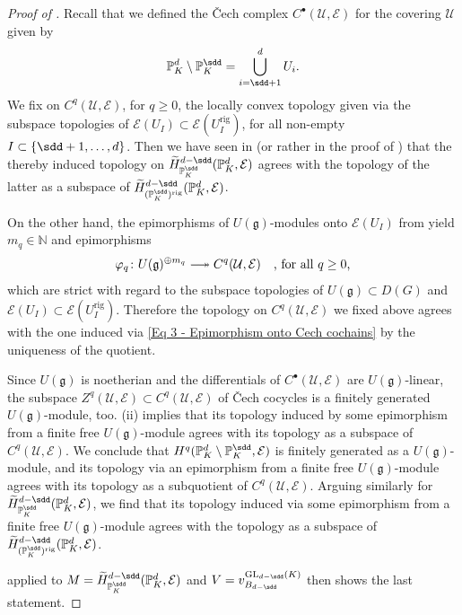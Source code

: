 \documentclass[a4paper, reqno, 10pt]{amsart}
\theoremstyle{definition}
\numberwithin{equation}{section}
\newcommand{\GL}{{\mathrm{GL}}}
\newcommand{\rig}{{\mathrm{rig}}}
\newcommand{\BN}{{\mathbb {N}}}
\newcommand{\BP}{{\mathbb {P}}}
\newcommand{\CE}{{\mathcal {E}}}
\newcommand{\CU}{{\mathcal {U}}}
\newcommand{\Fg}{{\mathfrak {g}}}
\DeclareRobustCommand\longtwoheadrightarrow
{\relbar\joinrel\twoheadrightarrow}
\begin{document}
\begin{proof}[{Proof of }]
	Recall that we defined the \v{C}ech complex $C^\bullet(\CU, \CE)$ for the covering $\CU$ given by
	\begin{equation*}
		\BP_K^d \setminus \BP_K^\sdd = \bigcup_{i= \sdd+1}^d U_i .
	\end{equation*}
	We fix on $C^q (\CU,\CE)$, for $q\geq 0$, the locally convex topology given via the subspace topologies of $\CE(U_I) \subset \CE(U_I^\rig)$, for all non-empty $I \subset \{\sdd+1,\ldots,d\}$.
	Then we have seen in  (or rather in the proof of ) that the thereby induced topology on $\widetilde{H}^{d-\sdd}_{\BP_K^\sdd} (\BP_K^d, \CE) $ agrees with the topology of the latter as a subspace of $\widetilde{H}^{d-\sdd}_{(\BP_K^{\sdd})^\rig} (\BP_K^d, \CE)$.
	
	
	On the other hand, the epimorphisms of $U(\Fg)$-modules onto $\CE(U_I)$ from  yield $m_q \in \BN$ and epimorphisms 
	\begin{equation}\label{Eq 3 - Epimorphism onto Cech cochains}
		\varphi_q \colon U(\Fg)^{\oplus m_q} \longtwoheadrightarrow C^q(\CU,\CE) \quad\text{, for all $q\geq 0$,}
	\end{equation}
	which are strict with regard to the subspace topologies of $U(\Fg) \subset D(G)$ and $\CE(U_I) \subset \CE(U_I^\rig)$.
	Therefore the topology on $C^q(\CU,\CE)$ we fixed above agrees with the one induced via \eqref{Eq 3 - Epimorphism onto Cech cochains} by the uniqueness of the quotient.
	
	
	Since $U(\Fg)$ is noetherian and the differentials of $C^\bullet(\CU,\CE)$ are $U(\Fg)$-linear, the subspace $Z^q(\CU,\CE) \subset C^q(\CU,\CE)$ of \v{C}ech cocycles is a finitely generated $U(\Fg)$-module, too.
	 (ii) implies that its topology induced by some epimorphism from a finite free $U(\Fg)$-module agrees with its topology as a subspace of $C^q(\CU,\CE)$.
	We conclude that $H^q(\BP_K^d\setminus \BP_K^\sdd, \CE)$ is finitely generated as a $U(\Fg)$-module, and its topology via an epimorphism from a finite free $U(\Fg)$-module agrees with its topology as a subquotient of $C^q(\CU,\CE)$.
	Arguing similarly for $\widetilde{H}^{d-\sdd}_{\BP_K^\sdd} (\BP_K^d, \CE) $, we find that its topology induced via some epimorphism from a finite free $U(\Fg)$-module agrees with the topology as a subspace of $\widetilde{H}^{d-\sdd}_{(\BP_K^{\sdd})^\rig} (\BP_K^d, \CE)$.
	
	
	 applied to $M = \widetilde{H}^{d-\sdd}_{\BP_K^\sdd} (\BP_K^d, \CE) $ and $V = v^{\GL_{d-\sdd}(K)}_{B_{d-\sdd}}$ then shows the last statement.
\end{proof}
\end{document}
